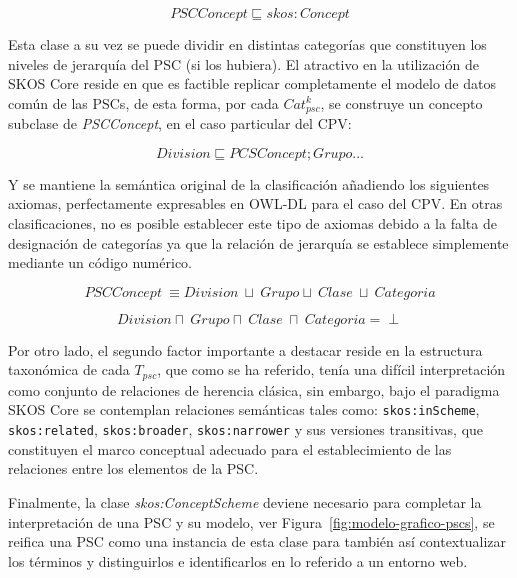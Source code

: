 \begin{equation}
 PSCConcept \sqsubseteq skos:Concept
\end{equation}

Esta clase a su vez se puede dividir en distintas categorías que constituyen
los niveles de jerarquía del PSC (si los hubiera). El atractivo en la utilización de SKOS Core reside 
en que es factible replicar completamente el modelo de datos común de las PSCs, de esta forma, por cada $Cat_{psc}^k$,
se construye un concepto subclase de \textit{PSCConcept}, en el caso particular del \gls{CPV}:

\begin{equation}
 Division \sqsubseteq PCSConcept;Grupo \text{...}
\end{equation}

Y se mantiene la semántica original de la clasificación añadiendo los siguientes
axiomas, perfectamente expresables en OWL-DL para el caso del CPV. En otras clasificaciones, no 
es posible establecer este tipo de axiomas debido a la falta de designación de categorías ya que la 
relación de jerarquía se establece simplemente mediante un código numérico.

\begin{equation}
 PSCConcept\ \equiv Division\ \sqcup\ Grupo \sqcup\ Clase\ \sqcup\ Categoria
\end{equation}

\begin{equation}
Division \sqcap\ Grupo \sqcap\ Clase\ \sqcap\ Categoria = \perp
\end{equation}

Por otro lado, el segundo factor importante a destacar reside en la estructura taxonómica de cada
$T_{psc}$, que como se ha referido, tenía una difícil interpretación como conjunto de
relaciones de herencia clásica, sin embargo, bajo el paradigma SKOS Core se contemplan relaciones 
semánticas tales como: \texttt{skos:inScheme}, \texttt{skos:related}, \texttt{skos:broader}, \texttt{skos:narrower} y sus versiones transitivas, que
constituyen el marco conceptual adecuado para el establecimiento de las relaciones entre los elementos de la PSC.

Finalmente, la clase \textit{skos:ConceptScheme} deviene necesario para completar la 
interpretación de una PSC y su modelo, ver Figura~\ref{fig:modelo-grafico-pscs}, se reifica 
una PSC como una instancia de esta clase para también así contextualizar los 
términos y distinguirlos e identificarlos en lo referido a un entorno web.


